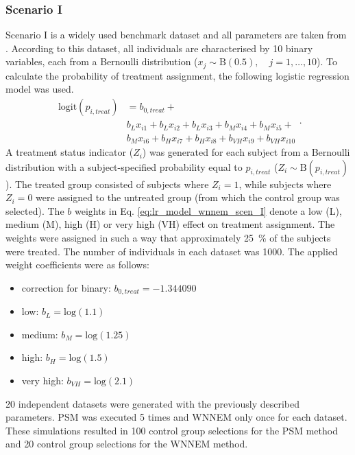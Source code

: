 		\subsubsection{Scenario I}
		\label{sec:wnnem_scen_1}
										
		Scenario I is a widely used benchmark dataset and all parameters are taken from \cite{austin2011comparing}. According to this dataset, all individuals are characterised by 10 binary variables, each from a Bernoulli distribution ($x_j\sim\textrm{B}(0.5), \quad j=1,\dots,10$). To calculate the probability of treatment assignment, the following logistic regression model was used.
		\begin{equation}
			\label{eq:lr_model_wnnem_scen_I}
			\begin{split}
				\textrm{logit}(p_{i,treat}) &= b_{0,treat} + \\
				& b_L x_{i1} + b_L x_{i2} + b_L x_{i3} + b_M x_{i4} + b_M x_{i5} +  \\
				& b_M x_{i6} + b_H x_{i7} + b_H x_{i8} + b_{VH} x_{i9} + b_{VH} x_{i10}
			\end{split}.
		\end{equation} 	  
		A treatment status indicator ($Z_i$) was generated for each subject from a Bernoulli distribution with a subject-specified probability equal to $p_{i, treat}$ ($Z_i\sim\textrm{B}(p_{i, treat})$). The treated group consisted of subjects where $Z_i=1$, while subjects where $Z_i=0$ were assigned to the untreated group (from which the control group was selected). The $b$ weights in Eq. \ref{eq:lr_model_wnnem_scen_I} denote a low (L), medium (M), high (H) or very high (VH) effect on treatment assignment. The weights were assigned in such a way that approximately \SI{25}{\percent} of the subjects were treated. The number of individuals in each dataset was 1000. The applied weight coefficients were as follows:
										
		\begin{itemize}
			\item correction for binary: $b_{0,treat}=-1.344090$
			\item low: $b_L=\textrm{log}(1.1)$
			\item medium: $b_M=\textrm{log}(1.25)$
			\item high: $b_H=\textrm{log}(1.5)$
			\item very high: $b_{VH}=\textrm{log}(2.1)$
		\end{itemize}
										
		20 independent datasets were generated with the previously described parameters. PSM was executed 5 times and WNNEM only once for each dataset. These simulations resulted in 100 control group selections for the PSM method and 20 control group selections for the WNNEM method.
										
